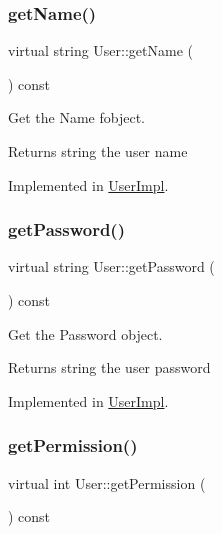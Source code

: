 \subsubsection{\texorpdfstring{get\+Name()}{getName()}}
{\footnotesize\ttfamily virtual string User\+::get\+Name (\begin{DoxyParamCaption}{ }\end{DoxyParamCaption}) const\hspace{0.3cm}{\ttfamily [pure virtual]}}



Get the Name fobject. 

\begin{DoxyReturn}{Returns}
string the user name 
\end{DoxyReturn}


Implemented in \hyperlink{classUserImpl_afb305ca89d0de723270de3433e3b5fc1}{User\+Impl}.

\mbox{\label{classUser_a29d4b884ba9f2a3f28a77368c86239fd}} 
\subsubsection{\texorpdfstring{get\+Password()}{getPassword()}}
{\footnotesize\ttfamily virtual string User\+::get\+Password (\begin{DoxyParamCaption}{ }\end{DoxyParamCaption}) const\hspace{0.3cm}{\ttfamily [pure virtual]}}



Get the Password object. 

\begin{DoxyReturn}{Returns}
string the user password 
\end{DoxyReturn}


Implemented in \hyperlink{classUserImpl_a984ad7c34f6893ad4c06bb7d31b0afb0}{User\+Impl}.

\mbox{\label{classUser_ae326f0c51a673f749ed57b9f0d0b723a}} 
\subsubsection{\texorpdfstring{get\+Permission()}{getPermission()}}
{\footnotesize\ttfamily virtual int User\+::get\+Permission (\begin{DoxyParamCaption}{ }\end{DoxyParamCaption}) const\hspace{0.3cm}{\ttfamily [pure virtual]}}



